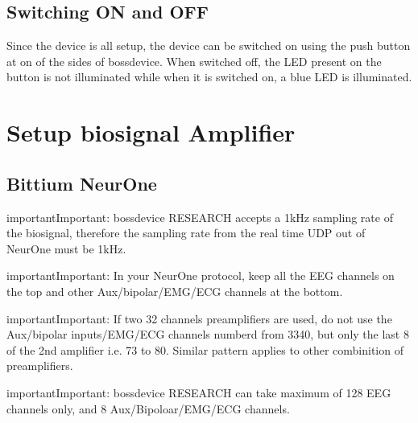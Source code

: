 \documentclass[letterpaper,10pt,english]{sphinxmanual}
\begin{document}
\section{Switching ON and OFF}
\label{\detokenize{2_setup_bossdevice_research:switching-on-and-off}}
\sphinxAtStartPar
Since the device is all setup, the device can be switched on using the push button at on of the sides of bossdevice. When switched off, the LED present on the button is not illuminated while when it is switched on, a blue LED is illuminated.


\chapter{Setup biosignal Amplifier}
\label{\detokenize{3_setup_biosignal_amplifier:setup-biosignal-amplifier}}\label{\detokenize{3_setup_biosignal_amplifier::doc}}

\section{Bittium NeurOne}
\label{\detokenize{3_setup_biosignal_amplifier:bittium-neurone}}
\begin{sphinxadmonition}{important}{Important:}
\sphinxAtStartPar
bossdevice RESEARCH accepts a 1kHz sampling rate of the biosignal, therefore the sampling rate from the real time UDP out of NeurOne must be 1kHz.
\end{sphinxadmonition}

\begin{sphinxadmonition}{important}{Important:}
\sphinxAtStartPar
In your NeurOne protocol, keep all the EEG channels on the top and other Aux/bipolar/EMG/ECG channels at the bottom.
\end{sphinxadmonition}

\begin{sphinxadmonition}{important}{Important:}
\sphinxAtStartPar
If two 32 channels preamplifiers are used, do not use the Aux/bipolar inputs/EMG/ECG channels numberd from 33\sphinxhyphen{}40, but only the last 8 of the 2nd amplifier i.e. 73 to 80. Similar pattern applies to other combinition of preamplifiers.
\end{sphinxadmonition}

\begin{sphinxadmonition}{important}{Important:}
\sphinxAtStartPar
bossdevice RESEARCH can take maximum of 128 EEG channels only, and 8 Aux/Bipoloar/EMG/ECG channels.
\end{sphinxadmonition}
\end{document}
